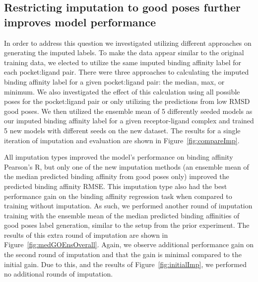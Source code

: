 \documentclass[journal=jmcmar,manuscript=article]{achemso}
\begin{document}
\subsection{Restricting imputation to good poses further improves model performance}
In order to address this question we investigated utilizing different approaches on generating the imputed labels.
To make the data appear similar to the original training data, we elected to utilize the same imputed binding affinity label for each pocket:ligand pair.
There were three approaches to calculating the imputed binding affinity label for a given pocket:ligand pair: the median, max, or minimum.
We also investigated the effect of this calculation using all possible poses for the pocket:ligand pair or only utilizing the predictions from low RMSD good poses.
We then utilized the ensemble mean of 5 differently seeded models as our imputed binding affinity label for a given receptor-ligand complex and trained 5 new models with different seeds on the new dataset.
The results for a single iteration of imputation and evaluation are shown in Figure~\ref{fig:compareImp}.

All imputation types improved the model's performance on binding affinity Pearson's R, but only one of the new imputation methods (an ensemble mean of the median predicted binding affinity from good poses only) improved the predicted binding affinity RMSE.
This imputation type also had the best performance gain on the binding affinity regression task when compared to training without imputation.
As such, we performed another round of imputation training with the ensemble mean of the median predicted binding affinities of good poses label generation, similar to the setup from the prior experiment.
The results of this extra round of imputation are shown in Figure~\ref{fig:medGOEnsOverall}.
Again, we observe additional performance gain on the second round of imputation and that the gain is minimal compared to the initial gain.
Due to this, and the results of Figure~\ref{fig:initialImp}, we performed no additional rounds of imputation.
\end{document}
